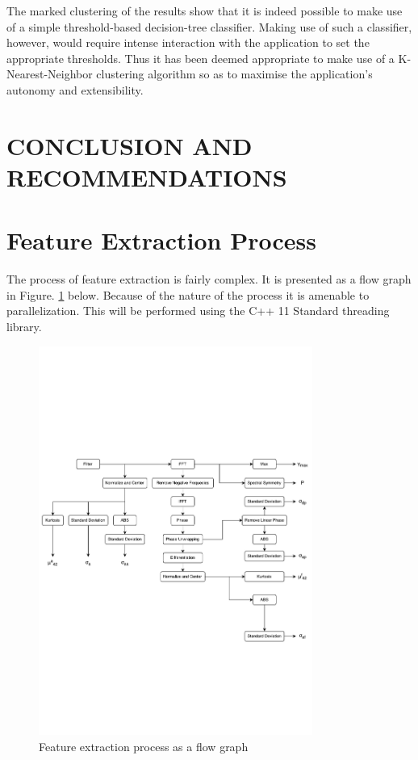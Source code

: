 \documentclass[10pt,twocolumn]{witseiepaper}
\begin{document}
	The marked clustering of the results show that it is indeed possible to make use of a simple threshold-based decision-tree classifier. Making use of such a classifier, however, would require intense interaction with the application to set the appropriate thresholds. Thus it has been deemed appropriate to make use of a K-Nearest-Neighbor clustering algorithm so as to maximise the application's autonomy and extensibility.


\section{CONCLUSION AND RECOMMENDATIONS}


 
\newpage

\onecolumn
\appendix
\setcounter{figure}{0}
\section{Feature Extraction Process}
\label{app:feature}
The process of feature extraction is fairly complex. It is presented as a flow graph in Figure. \ref{fig:feature} below. Because of the nature of the process it is amenable to parallelization. This will be performed using the C++ 11 Standard threading library.

\begin{figure}[h!]
	\centering
	\includegraphics[trim=0cm 10cm 0cm 11cm, clip=true,width=0.8\textwidth]{large.pdf}
	\caption{Feature extraction process as a flow graph}
	\label{fig:feature}
\end{figure}
\end{document}
